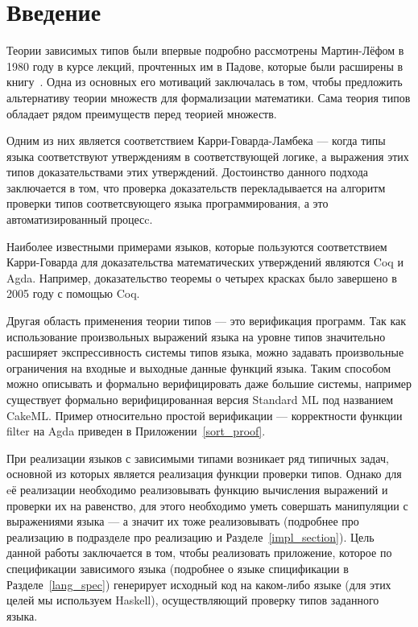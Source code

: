 \section*{Введение}
  Теории зависимых типов были впервые подробно рассмотрены Мартин-Лёфом в 1980 году в курсе лекций, прочтенных им в Падове, которые были расширены в книгу~\cite{martin_lof}. Одна из основных его мотиваций заключалась в том, чтобы предложить альтернативу теории множеств для формализации математики. Сама теория типов обладает рядом преимуществ перед теорией множеств\cite{farmer_seven}.

Одним из них является соответствием Карри-Говарда-Ламбека\cite{curry_how} --- когда типы языка соответствуют утверждениям в соответствующей логике, а выражения этих типов доказательствами этих утверждений. Достоинство данного подхода заключается в том, что проверка доказательств перекладывается на алгоритм проверки типов соответсвующего языка программирования, а это автоматизированный процесc.

Наиболее известными примерами языков, которые пользуются соответствием Карри-Говарда для доказательства математических утверждений являются Coq\cite{coq} и Agda\cite{agda}. Например, доказательство теоремы о четырех красках было завершено в 2005 году с помощью Coq\cite{weisstein2002four}.

Другая область применения теории типов --- это верификация программ. Так как использование произвольных выражений языка на уровне типов значительно расширяет экспрессивность системы типов языка, можно задавать произвольные ограничения на входные и выходные данные функций языка. Таким способом можно описывать и формально верифицировать даже большие системы, например существует формально верифицированная версия Standard ML\cite{ml_lang} под названием CakeML\cite{ml_cake}. Пример относительно простой верификации --- корректности функции filter на Agda приведен в Приложении~\ref{sort_proof}.

\hfill

При реализации языков с зависимыми типами возникает ряд типичных задач, основной из которых является реализация функции проверки типов. Однако для eё реализации необходимо реализовывать функцию вычисления выражений и проверки их на равенство, для этого необходимо уметь совершать манипуляции с выражениями языка --- а значит их тоже реализовывать (подробнее про реализацию в подразделе про реализацию и Разделе~\ref{impl_section}). Цель данной работы заключается в том, чтобы реализовать приложение, которое по спецификации зависимого языка (подробнее о языке спицификации в Разделе~\ref{lang_spec}) генерирует исходный код на каком-либо языке (для этих целей мы используем Haskell\cite{haskell}), осуществляющий проверку типов заданного языка.

